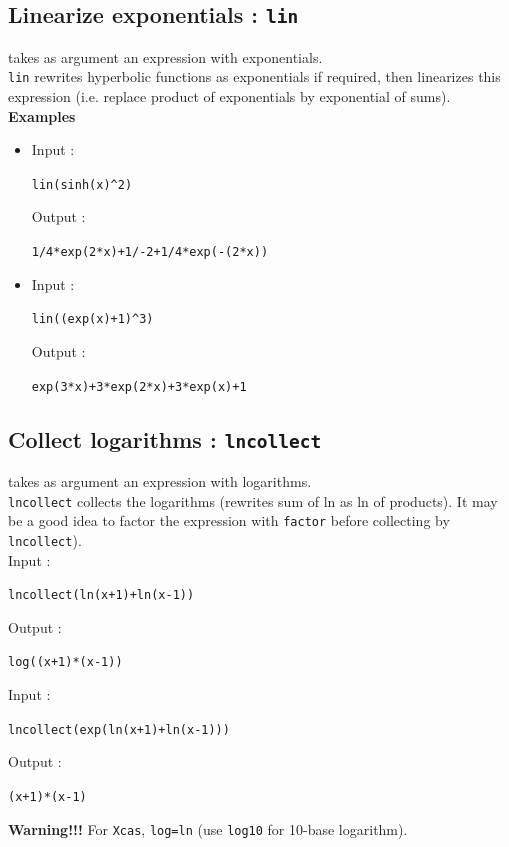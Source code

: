 \documentclass[a4paper,11pt]{book}
\begin{document}
\subsection{Linearize exponentials : {\tt lin}}
 takes as argument an expression with
exponentials.\\
{\tt lin} rewrites hyperbolic functions as exponentials if required,
then linearizes this expression (i.e. replace product of
exponentials by exponential of sums).\\
{\bf Examples}
\begin{itemize}
\item Input :
\begin{center}{\tt lin(sinh(x)\verb|^|2)}\end{center}
Output :
\begin{center}{\tt 1/4*exp(2*x)+1/-2+1/4*exp(-(2*x))}\end{center}

\item Input :
\begin{center}{\tt lin((exp(x)+1)\verb|^|3)}\end{center}
Output :
\begin{center}{\tt exp(3*x)+3*exp(2*x)+3*exp(x)+1}\end{center}
\end{itemize}

\subsection{Collect logarithms : {\tt lncollect}}
 takes as argument an expression with logarithms.\\
{\tt lncollect} collects the logarithms (rewrites sum of ln
as ln of products). 
It may be a good idea to factor the 
expression with {\tt factor} before collecting by {\tt lncollect}).\\
Input :
\begin{center}{\tt lncollect(ln(x+1)+ln(x-1))}\end{center}
Output :
\begin{center}{\tt log((x+1)*(x-1))}\end{center}
Input :
\begin{center}{\tt lncollect(exp(ln(x+1)+ln(x-1)))}\end{center}
Output :
\begin{center}{\tt (x+1)*(x-1)}\end{center}
{\bf Warning!!!}  For {\tt Xcas}, {\tt log=ln} (use {\tt log10}
for 10-base logarithm).
\end{document}
